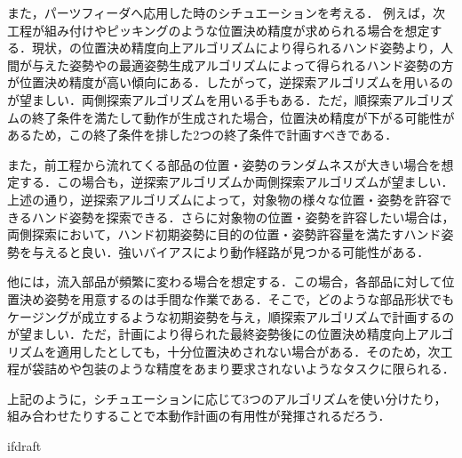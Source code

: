 \documentclass[a4paper,twoside,12pt,papersize, dvipdfmx]{iirthesis}
\begin{document}
また，パーツフィーダへ応用した時のシチュエーションを考える．
例えば，次工程が組み付けやピッキングのような位置決め精度が求められる場合を想定する．現状，の位置決め精度向上アルゴリズムにより得られるハンド姿勢より，人間が与えた姿勢やの最適姿勢生成アルゴリズムによって得られるハンド姿勢の方が位置決め精度が高い傾向にある．したがって，逆探索アルゴリズムを用いるのが望ましい．両側探索アルゴリズムを用いる手もある．ただ，順探索アルゴリズムの終了条件を満たして動作が生成された場合，位置決め精度が下がる可能性があるため，この終了条件を排した2つの終了条件で計画すべきである．\par
また，前工程から流れてくる部品の位置・姿勢のランダムネスが大きい場合を想定する．この場合も，逆探索アルゴリズムか両側探索アルゴリズムが望ましい．上述の通り，逆探索アルゴリズムによって，対象物の様々な位置・姿勢を許容できるハンド姿勢を探索できる．さらに対象物の位置・姿勢を許容したい場合は，両側探索において，ハンド初期姿勢に目的の位置・姿勢許容量を満たすハンド姿勢を与えると良い．強いバイアスにより動作経路が見つかる可能性がある．\par
他には，流入部品が頻繁に変わる場合を想定する．この場合，各部品に対して位置決め姿勢を用意するのは手間な作業である．そこで，どのような部品形状でもケージングが成立するような初期姿勢を与え，順探索アルゴリズムで計画するのが望ましい．ただ，計画により得られた最終姿勢後にの位置決め精度向上アルゴリズムを適用したとしても，十分位置決めされない場合がある．そのため，次工程が袋詰めや包装のような精度をあまり要求されないようなタスクに限られる．\par

上記のように，シチュエーションに応じて3つのアルゴリズムを使い分けたり，組み合わせたりすることで本動作計画の有用性が発揮されるだろう．

\expandafter\ifx\csname ifdraft\endcsname\relax
    
\end{document}
